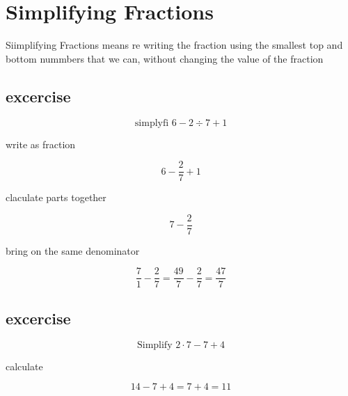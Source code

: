 \documentclass[12pt]{article}
\begin{document}
\section{Simplifying Fractions}


Siimplifying Fractions means re writing the fraction using the 
smallest top and bottom nummbers that we can, without changing the value of 
the fraction 

\subsection{excercise}
$$ \text{simplyfi } 6 - 2 \div 7 + 1 $$

write as fraction

$$ 6- \frac{2}{7} +1 $$

claculate parts together

$$ 7 - \frac{2}{7} $$

bring on the same denominator

$$ \frac{7}{1} - \frac{2}{7} = \frac{49}{7} - \frac{2}{7} = \frac{47}{7} $$

\subsection{excercise}

$$ \text{Simplify } 2 \cdot 7 - 7 + 4 $$

calculate

$$ 14 -7 + 4 = 7+4 = 11 $$
\end{document}
